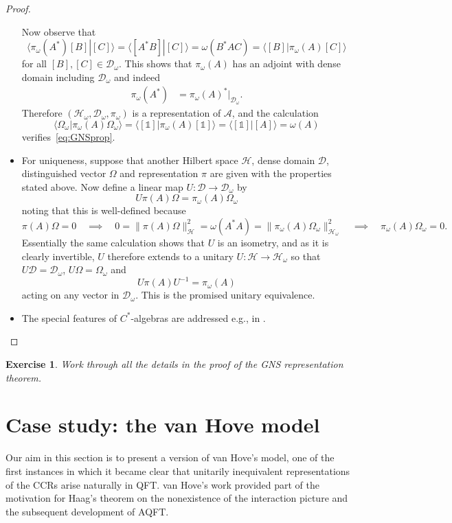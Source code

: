 \documentclass[12pt,a4paper]{article}
\newcommand{\1}{\mathds{1}}                         %
\newcommand{\HH}{{\mathcal{H}}}
\newcommand{\DD}{{\mathscr{D}}}
\newcommand{\II}{{\mathbb{1}}}
\newcommand{\Ac}{{\mathcal{A}}}
\newcommand{\ip}[2]{\langle #1|#2\rangle}
\newtheorem{exercise}[theorem]{Exercise}
\begin{document}
\begin{proof}
\begin{itemize}
		Now observe that 
		\[
		\ip{\pi_\omega(A^*)[B]}{[C]} = \ip{[A^*B]}{[C]} =\omega(B^*AC) = \ip{[B]}{\pi_\omega(A)[C]}
		\] 
		for all $[B],[C]\in\DD_\omega$. This shows that $\pi_\omega(A)$ has an adjoint with dense domain including $\DD_\omega$ and indeed
		\begin{align*}
		\pi_\omega(A^*) &= \pi_\omega(A)^*|_{\DD_\omega}.
		\end{align*}
		Therefore $(\HH_\omega,\DD_\omega,\pi_\omega)$ is a representation of $\Ac$, and the calculation
		\[
		\ip{\Omega_\omega}{\pi_\omega(A)\Omega_\omega} = \ip{[\II]}{\pi_\omega(A)[\II]} = \ip{[\II]}{[A]}=\omega(A)
		\]
		verifies~\eqref{eq:GNSprop}. 
		\item For uniqueness, suppose that another Hilbert space $\HH$, dense domain $\DD$, distinguished vector $\Omega$ and representation $\pi$ are given with the properties stated above. Now define a linear map $U:\DD\to \DD_\omega$ by
		\[
		U\pi(A)\Omega = \pi_\omega(A)\Omega_\omega
		\]
		noting that this is well-defined because 
		\[
		\pi(A)\Omega=0 \quad \implies \quad 0=\|\pi(A)\Omega\|_\HH^2=\omega(A^*A)=\|\pi_\omega(A)\Omega_\omega\|_{\HH_\omega}^2 \quad\implies\quad  \pi_\omega(A)\Omega_\omega = 0.
		\]
		Essentially the same calculation shows that $U$ is an isometry, and as it is clearly invertible, $U$ therefore extends to a unitary $U:\HH\to\HH_\omega$ so that $U\DD=\DD_\omega$, $U\Omega=\Omega_\omega$ and
		\[
		U\pi(A)U^{-1} = \pi_\omega(A)
		\]
		acting on any vector in $\DD_\omega$. This is the promised unitary equivalence.
		\item The special features of $C^*$-algebras are addressed e.g., in \cite[Prop.~2.3.3 and \S 2.3.3]{BratRob:vol1} .
	\end{itemize}
\end{proof}
\begin{exercise}
	Work through all the details in the proof of the GNS representation theorem.
\end{exercise}
	\section{Case study: the van Hove model}\label{sec:vH}
	
	Our aim in this section is to present a version of van Hove's model, one of the first instances in which it became clear that unitarily inequivalent representations of the CCRs arise naturally in QFT. van Hove's work provided part of the motivation for Haag's theorem on the nonexistence of the interaction picture and the subsequent development of AQFT.
	
\end{document}
